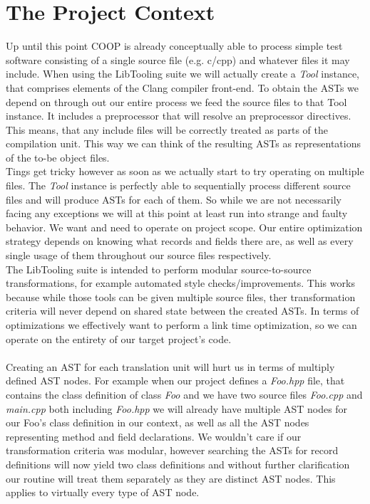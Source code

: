 \chapter{The Project Context}\label{project_scope_transformations}
Up until this point COOP is already conceptually able to process simple test software consisting of a single source file (e.g. c/cpp) and whatever files it may include. When using the LibTooling suite we will actually create a \textit{Tool} instance, that comprises elements of the Clang compiler front-end. To obtain the ASTs we depend on through out our entire process we feed the source files to that Tool instance. It includes a preprocessor that will resolve an preprocessor directives. This means, that any include files will be correctly treated as parts of the compilation unit. This way we can think of the resulting ASTs as representations of the to-be object files.\\
Tings get tricky however as soon as we actually start to try operating on multiple files. The \textit{Tool} instance is perfectly able to sequentially process different source files and will produce ASTs for each of them. So while we are not necessarily facing any exceptions we will at this point at least run into strange and faulty behavior. We want and need to operate on project scope. Our entire optimization strategy depends on knowing what records and fields there are, as well as every single usage of them throughout our source files respectively.\\
The LibTooling suite is intended to perform modular source-to-source transformations, for example automated style checks/improvements. This works because while those tools can be given multiple source files, ther transformation criteria will never depend on shared state between the created ASTs. In terms of optimizations we effectively want to perform a link time optimization, so we can operate on the entirety of our target project's code.\\\\
Creating an AST for each translation unit will hurt us in terms of multiply defined AST nodes. For example when our project defines a \textit{Foo.hpp} file, that contains the class definition of class \textit{Foo} and we have two source files \textit{Foo.cpp} and \textit{main.cpp} both including \textit{Foo.hpp} we will already have multiple AST nodes for our Foo's class definition in our context, as well as all the AST nodes representing method and field declarations. We wouldn't care if our transformation criteria was modular, however searching the ASTs for record definitions will now yield two class definitions and without further clarification our routine will treat them separately as they are distinct AST nodes. This applies to virtually every type of AST node.\\
